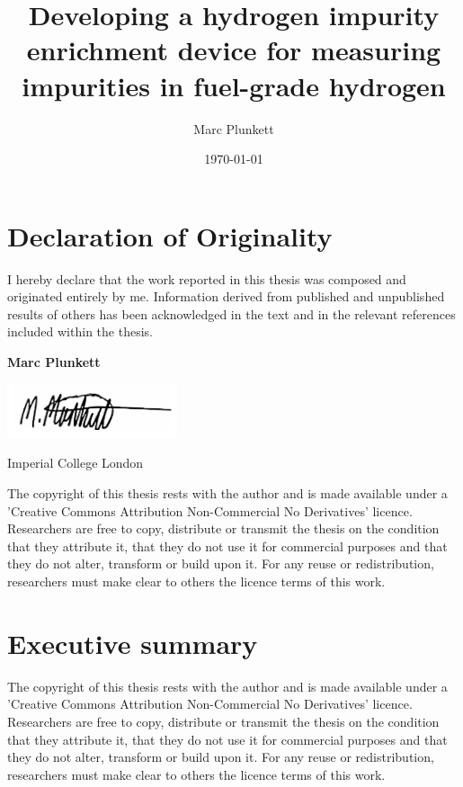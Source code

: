 \documentclass[a4paper,12pt]{report}
\begin{document}
\title{Developing a hydrogen impurity enrichment device for measuring impurities in fuel-grade hydrogen}
\author{Marc Plunkett}
\date{\today}
\maketitle

\chapter*{Declaration of Originality}
I hereby declare that the work reported in this thesis was composed and originated entirely by me. Information derived from published and unpublished results of others has been acknowledged in the text and in the relevant references included within the thesis.

\noindent\newline
\textbf{Marc Plunkett}\newline

\includegraphics[width=50mm,scale=0.5]{figures/sig.png}\newline

\noindent
Imperial College London\newline

The copyright of this thesis rests with the author and is made available under a 'Creative Commons Attribution Non-Commercial No Derivatives' licence. Researchers are free to copy, distribute or transmit the thesis on the condition that they attribute it, that they do not use it for commercial purposes and that they do not alter, transform or build upon it. For any reuse or redistribution, researchers must make clear to others the licence terms of this work.


\chapter*{Executive summary}
The copyright of this thesis rests with the author and is made available under a 'Creative Commons Attribution Non-Commercial No Derivatives' licence. Researchers are free to copy, distribute or transmit the thesis on the condition that they attribute it, that they do not use it for commercial purposes and that they do not alter, transform or build upon it. For any reuse or redistribution, researchers must make clear to others the licence terms of this work.
\end{document}
